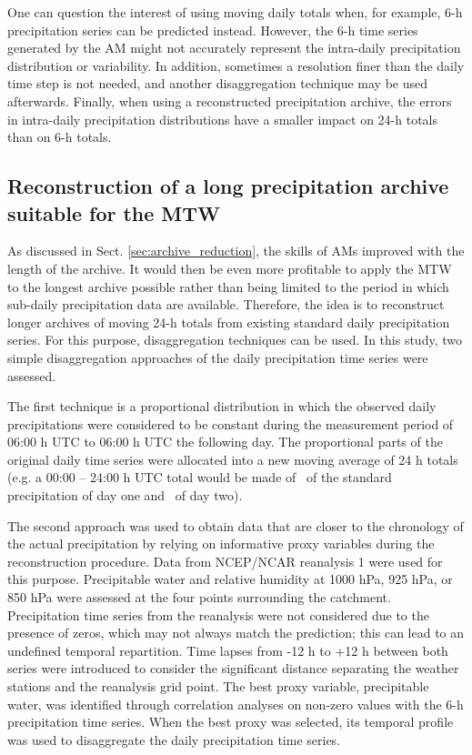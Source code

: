 \documentclass[hess, manuscript]{copernicus}
\begin{document}
	One can question the interest of using moving daily totals when, for example, 6-h precipitation series can be predicted instead. However, the 6-h time series generated by the AM might not accurately represent the intra-daily precipitation distribution or variability. In addition, sometimes a resolution finer than the daily time step is not needed, and another disaggregation technique may be used afterwards. Finally, when using a reconstructed precipitation archive, the errors in intra-daily precipitation distributions have a smaller impact on 24-h totals than on 6-h totals.
	
	
	\subsection{Reconstruction of a long precipitation archive suitable for the MTW}
	\label{sec:reconstruction}
	
	As discussed in Sect. \ref{sec:archive_reduction}, the skills of AMs improved with the length of the archive. It would then be even more profitable to apply the MTW to the longest archive possible rather than being limited to the period in which sub-daily precipitation data are available. Therefore, the idea is to reconstruct longer archives of moving 24-h totals from existing standard daily precipitation series. For this purpose, disaggregation techniques can be used. In this study, two simple disaggregation approaches of the daily precipitation time series were assessed.
	
	The first technique is a proportional distribution in which the observed daily precipitations were considered to be constant during the measurement period of 06:00 h UTC to 06:00 h UTC the following day. The proportional parts of the original daily time series were allocated into a new moving average of 24 h totals (e.g. a 00:00 -- 24:00 h UTC total would be made of \textonequarter\ of the standard precipitation of day one and \textthreequarters\ of day two). 
	
	The second approach was used to obtain data that are closer to the chronology of the actual precipitation by relying on informative proxy variables during the reconstruction procedure. Data from NCEP/NCAR reanalysis 1 were used for this purpose. Precipitable water and relative humidity at 1000 hPa, 925 hPa, or 850 hPa were assessed at the four points surrounding the catchment. Precipitation time series from the reanalysis were not considered due to the presence of zeros, which may not always match the prediction; this can lead to an undefined temporal repartition. Time lapses from -12 h to +12 h between both series were introduced to consider the significant distance separating the weather stations and the reanalysis grid point. The best proxy variable, precipitable water, was identified through correlation analyses on non-zero values with the 6-h precipitation time series. When the best proxy was selected, its temporal profile was used to disaggregate the daily precipitation time series.
	
\end{document}

